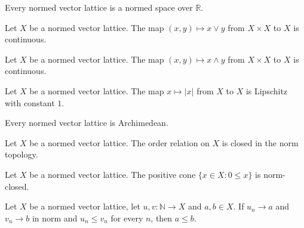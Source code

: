 \begin{lemma}
\label{lem:normed-vector-lattice-normed-space}
\leanok
{}
Every normed vector lattice is a normed space over $\mathbb{R}$.
\end{lemma}

\begin{theorem}
\label{thm:continuous-sup}
\leanok
{}
Let $X$ be a normed vector lattice. The map $(x, y) \mapsto x \vee y$
from $X \times X$ to $X$ is continuous.
\end{theorem}

\begin{theorem}
\label{thm:continuous-inf}
\leanok
{}
Let $X$ be a normed vector lattice. The map $(x, y) \mapsto x \wedge y$
from $X \times X$ to $X$ is continuous.
\end{theorem}

\begin{theorem}
\label{thm:lipschitz-abs}
\leanok
{}
Let $X$ be a normed vector lattice. The map $x \mapsto \lvert x \rvert$
from $X$ to $X$ is Lipschitz with constant $1$.
\end{theorem}

\begin{theorem}
\label{thm:normed-vector-lattice-archimedean}
\leanok
{}
Every normed vector lattice is Archimedean.
\end{theorem}

\begin{lemma}
\label{lem:normed-vector-lattice-orderClosedTopology}
\leanok
{}
Let $X$ be a normed vector lattice. The order relation on $X$ is closed
in the norm topology.
\end{lemma}

\begin{theorem}
\label{thm:isClosed-nonneg-cone}
\leanok
{}
Let $X$ be a normed vector lattice. The positive cone
$\{x \in X : 0 \le x\}$ is norm-closed.
\end{theorem}

\begin{theorem}
\label{thm:le-of-tendsto-of-tendsto}
\leanok
{}
Let $X$ be a normed vector lattice, let $u, v : \mathbb{N} \to X$ and
$a, b \in X$. If $u_n \to a$ and $v_n \to b$ in norm and
$u_n \le v_n$ for every $n$, then $a \le b$.
\end{theorem}

